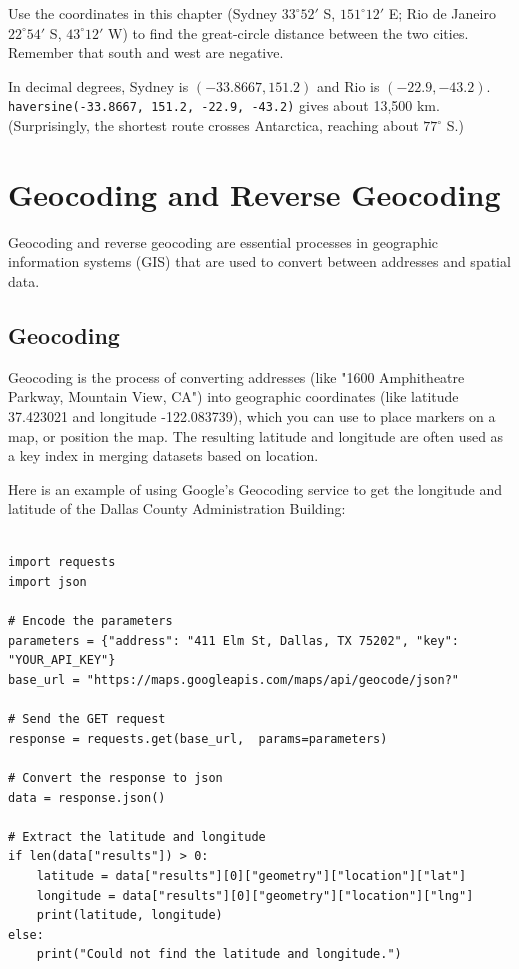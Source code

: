 \begin{Exercise}[title={Sydney to Rio}, label=haversine1]
Use the coordinates in this chapter (Sydney $33^\circ 52'$ S, $151^\circ 12'$ E; Rio de Janeiro $22^\circ 54'$ S, $43^\circ 12'$ W) to find the great-circle distance between the two cities. Remember that south and west are negative.
\end{Exercise}
\begin{Answer}[ref=haversine1]
In decimal degrees, Sydney is $(-33.8667, 151.2)$ and Rio is $(-22.9, -43.2)$. \texttt{haversine(-33.8667, 151.2, -22.9, -43.2)} gives about 13,500 km. (Surprisingly, the shortest route crosses Antarctica, reaching about $77^\circ$ S.)
\end{Answer}



\section{Geocoding and Reverse Geocoding}

Geocoding and reverse geocoding are essential processes in geographic
information systems (GIS) that are used to convert between addresses
and spatial data.

\subsection{Geocoding}

Geocoding is the process of converting addresses (like "1600
Amphitheatre Parkway, Mountain View, CA") into geographic coordinates
(like latitude 37.423021 and longitude -122.083739), which you can use
to place markers on a map, or position the map. The resulting latitude
and longitude are often used as a key index in merging datasets based
on location.

Here is an example of using Google's Geocoding service to get the
longitude and latitude of the Dallas County Administration Building:

\begin{verbatim}

import requests
import json

# Encode the parameters
parameters = {"address": "411 Elm St, Dallas, TX 75202", "key": "YOUR_API_KEY"}
base_url = "https://maps.googleapis.com/maps/api/geocode/json?"

# Send the GET request
response = requests.get(base_url,  params=parameters)

# Convert the response to json
data = response.json()

# Extract the latitude and longitude
if len(data["results"]) > 0:
    latitude = data["results"][0]["geometry"]["location"]["lat"]
    longitude = data["results"][0]["geometry"]["location"]["lng"]
    print(latitude, longitude)
else:
    print("Could not find the latitude and longitude.")
    
\end{verbatim}

